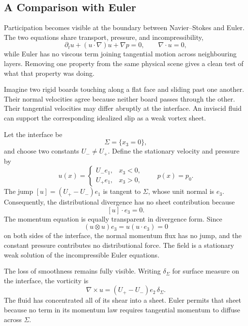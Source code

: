\subsection{A Comparison with Euler}\label{sub:AComparisonWithEuler}

Participation becomes visible at the boundary between Navier--Stokes and Euler.
The two equations share transport, pressure, and incompressibility,
\[
  \partial_tu+(u\cdot\nabla)u+\nabla p=0,
  \qquad
  \nabla\cdot u=0,
\]
while Euler has no viscous term joining tangential motion across neighbouring layers.
Removing one property from the same physical scene gives a clean test of what that property was doing.

Imagine two rigid boards touching along a flat face and sliding past one another.
Their normal velocities agree because neither board passes through the other.
Their tangential velocities may differ abruptly at the interface.
An inviscid fluid can support the corresponding idealized slip as a weak vortex sheet.

Let the interface be
\[
  \Sigma=\{x_3=0\},
\]
and choose two constants \(U_-\neq U_+\).
Define the stationary velocity and pressure by
\[
  u(x)=
  \begin{cases}
    U_-e_1, & x_3<0,\\
    U_+e_1, & x_3>0,
  \end{cases}
  \qquad
  p(x)=p_0.
\]
The jump \( [u]=(U_+-U_-)e_1 \) is tangent to \(\Sigma\), whose unit normal is \(e_3\).
Consequently, the distributional divergence has no sheet contribution because
\[
  [u]\cdot e_3=0.
\]
The momentum equation is equally transparent in divergence form.
Since
\[
  (u\otimes u)e_3=u(u\cdot e_3)=0
\]
on both sides of the interface, the normal momentum flux has no jump, and the constant pressure contributes no distributional force.
The field is a stationary weak solution of the incompressible Euler equations.

The loss of smoothness remains fully visible.
Writing \(\delta_\Sigma\) for surface measure on the interface, the vorticity is
\[
  \nabla\times u
  =
  (U_+-U_-)e_2\,\delta_\Sigma.
\]
The fluid has concentrated all of its shear into a sheet.
Euler permits that sheet because no term in its momentum law requires tangential momentum to diffuse across \(\Sigma\).

